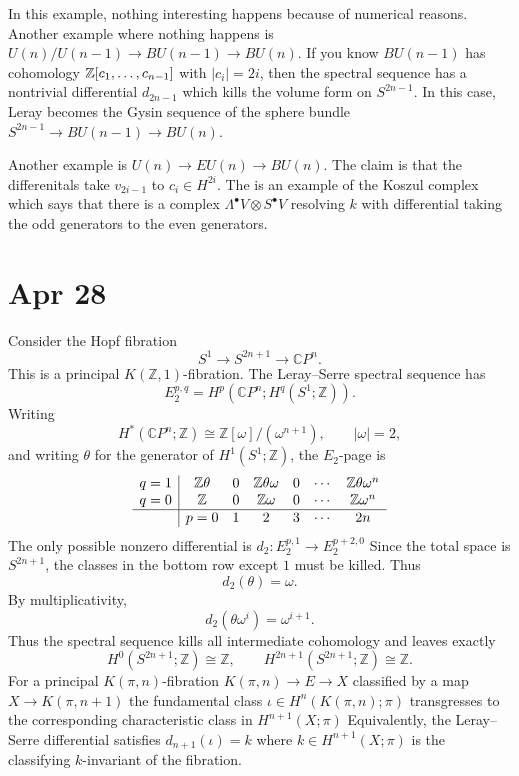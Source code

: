 \documentclass[12pt]{article}
\begin{document}
In this example, nothing interesting happens because of numerical reasons. Another example where nothing happens is $U(n)/U(n-1) \to BU(n-1) \to BU(n)$. If you know $BU(n-1)$ has cohomology $\mathbb{Z}[c_1,\dots,c_{n-1}]$ with $|c_i| = 2i$, then the spectral sequence has a nontrivial differential $d_{2n-1}$ which kills the volume form on $S^{2n-1}$. In this case, Leray becomes the Gysin sequence of the sphere bundle $S^{2n-1} \to BU(n-1) \to BU(n)$.

Another example is $U(n) \to EU(n) \to BU(n)$. The claim is that the differenitals take $v_{2i-1}$ to $c_i \in H^{2i}$. The is an example of the Koszul complex which says that there is a complex $\Lambda^\bullet V \otimes S^\bullet V$ resolving $k$ with differential taking the odd generators to the even generators. 

\section{Apr 28}

\begin{example}
Consider the Hopf fibration
\[
S^1 \longrightarrow S^{2n+1} \longrightarrow \mathbb CP^n.
\]
This is a principal $K(\mathbb Z,1)$-fibration. The Leray--Serre spectral sequence has
\[
E_2^{p,q}
=
H^p(\mathbb CP^n;H^q(S^1;\mathbb Z)).
\]
Writing
\[
H^*(\mathbb CP^n;\mathbb Z)\cong \mathbb Z[\omega]/(\omega^{n+1}),
\qquad
|\omega|=2,
\]
and writing $\theta$ for the generator of $H^1(S^1;\mathbb Z)$, the $E_2$-page is
\[
\begin{array}{c|cccccc}
q=1 & \mathbb Z\theta & 0 & \mathbb Z\theta\omega & 0 & \cdots & \mathbb Z\theta\omega^n \\
q=0 & \mathbb Z & 0 & \mathbb Z\omega & 0 & \cdots & \mathbb Z\omega^n \\
\hline
& p=0 & 1 & 2 & 3 & \cdots & 2n
\end{array}
\]
The only possible nonzero differential is $d_2\colon E_2^{p,1}\longrightarrow E_2^{p+2,0}$
Since the total space is $S^{2n+1}$, the classes in the bottom row except $1$ must be killed. Thus
\[
d_2(\theta)=\omega.
\]
By multiplicativity,
\[
d_2(\theta\omega^i)=\omega^{i+1}.
\]
Thus the spectral sequence kills all intermediate cohomology and leaves exactly
\[
H^0(S^{2n+1};\mathbb Z)\cong \mathbb Z,
\qquad
H^{2n+1}(S^{2n+1};\mathbb Z)\cong \mathbb Z.
\]
For a principal $K(\pi,n)$-fibration $K(\pi,n)\to E\to X$ classified by a map $X\to K(\pi,n+1)$ the fundamental class $\iota\in H^n(K(\pi,n);\pi)$
transgresses to the corresponding characteristic class in $H^{n+1}(X;\pi)$
Equivalently, the Leray--Serre differential satisfies $d_{n+1}(\iota)=k$
where $k\in H^{n+1}(X;\pi)$ is the classifying $k$-invariant of the fibration.
\end{example}
\end{document}

